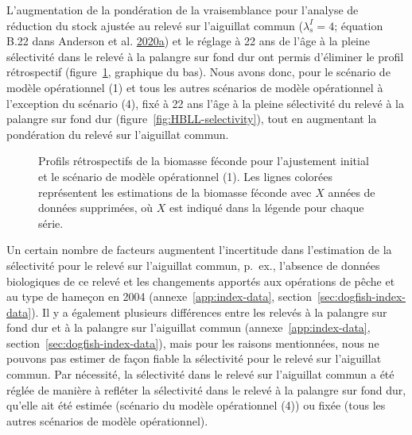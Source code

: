 \documentclass[11pt]{book}
\begin{document}
L'augmentation de la pondération de la vraisemblance pour l'analyse de réduction du stock ajustée au relevé sur l'aiguillat commun (\(\lambda^I_s = 4\); équation B.22 dans Anderson et al. \protect\hyperlink{ref-anderson2020gfmp}{2020}\protect\hyperlink{ref-anderson2020gfmp}{a}) et le réglage à 22 ans de l'âge à la pleine sélectivité dans le relevé à la palangre sur fond dur ont permis d'éliminer le profil rétrospectif (figure~\ref{fig:retro-initial}, graphique du bas). Nous avons donc, pour le scénario de modèle opérationnel (1) et tous les autres scénarios de modèle opérationnel à l'exception du scénario (4), fixé à 22 ans l'âge à la pleine sélectivité du relevé à la palangre sur fond dur (figure~\ref{fig:HBLL-selectivity}), tout en augmentant la pondération du relevé sur l'aiguillat commun.


\begin{figure}[htb]

{\centering {} 

}

\caption{Profils rétrospectifs de la biomasse féconde pour l'ajustement initial et le scénario de modèle opérationnel (1). Les lignes colorées représentent les estimations de la biomasse féconde avec \(X\) années de données supprimées, où \(X\) est indiqué dans la légende pour chaque série.}\label{fig:retro-initial}
\end{figure}
Un certain nombre de facteurs augmentent l'incertitude dans l'estimation de la sélectivité pour le relevé sur l'aiguillat commun, p.~ex., l'absence de données biologiques de ce relevé et les changements apportés aux opérations de pêche et au type de hameçon en 2004 (annexe~\ref{app:index-data}, section~\ref{sec:dogfish-index-data}). Il y a également plusieurs différences entre les relevés à la palangre sur fond dur et à la palangre sur l'aiguillat commun (annexe~\ref{app:index-data}, section~\ref{sec:dogfish-index-data}), mais pour les raisons mentionnées, nous ne pouvons pas estimer de façon fiable la sélectivité pour le relevé sur l'aiguillat commun. Par nécessité, la sélectivité dans le relevé sur l'aiguillat commun a été réglée de manière à refléter la sélectivité dans le relevé à la palangre sur fond dur, qu'elle ait été estimée (scénario du modèle opérationnel (4)) ou fixée (tous les autres scénarios de modèle opérationnel).
\end{document}

